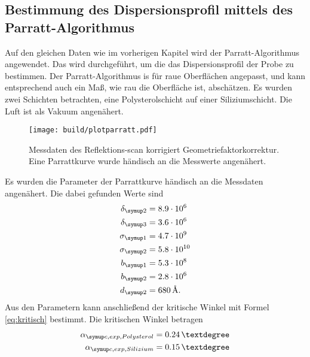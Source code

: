 \subsection{Bestimmung des Dispersionsprofil mittels des Parratt-Algorithmus}
Auf den gleichen Daten wie im vorherigen Kapitel wird der Parratt-Algorithmus angewendet. Das wird durchgeführt, um die das Dispersionsprofil
der Probe zu bestimmen. Der Parratt-Algorithmus is für raue Oberflächen angepasst, und kann entsprechend auch ein Maß, wie rau die Oberfläche
ist, abschätzen. Es wurden zwei Schichten betrachten, eine Polysterolschicht auf einer Siliziumschicht. Die Luft ist als Vakuum angenähert.
\begin{figure}
    \centering
    \texttt{[image: build/plotparratt.pdf]}
    \caption{Messdaten des Reflektions-scan korrigiert Geometriefaktorkorrektur. Eine Parrattkurve wurde händisch an die Messwerte angenähert.}
    \label{fig:refl}
\end{figure}
Es wurden die Parameter der Parrattkurve händisch an die Messdaten angenähert. Die dabei gefunden Werte sind
\begin{equation}
    \begin{aligned}
        \delta\idx{2} &= 8.9\cdot 10^{6} \\
        \delta\idx{3} &= 3.6\cdot 10^{6} \\
        \sigma\idx{1} &= 4.7\cdot 10^{9} \\
        \sigma\idx{2} &= 5.8\cdot 10^{10} \\
        b\idx{1} &= 5.3\cdot 10^{8} \\
        b\idx{2} &= 2.8\cdot 10^{6} \\
        d\idx{2} &=  680\,\si{\angstrom}.
    \end{aligned}
\end{equation}
Aus den Parametern kann anschließend der kritische Winkel mit Formel \eqref{eq:kritisch} bestimmt. Die kritischen Winkel betragen
\begin{equation}
    \begin{aligned}
        \alpha\idx{c, exp, Polysterol} &= 0.24\,° \\
        \alpha\idx{c, exp, Silizium} &= 0.15\,°
    \end{aligned}
\end{equation}